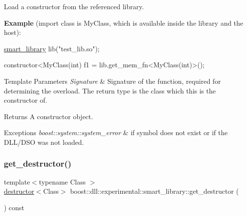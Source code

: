 Load a constructor from the referenced library.

{\bfseries Example} (import class is My\+Class, which is available inside the library and the host)\+:


\begin{DoxyCode}
\hyperlink{a01712_af1fa4c4ed871e889f92f4c11d574d91f}{smart\_library} lib(\textcolor{stringliteral}{"test\_lib.so"});

constructor<MyClass(\textcolor{keywordtype}{int})    f1 = lib.get\_mem\_fn<MyClass(\textcolor{keywordtype}{int})>();
\end{DoxyCode}



\begin{DoxyTemplParams}{Template Parameters}
{\em Signature} & Signature of the function, required for determining the overload. The return type is the class which this is the constructor of. \\
\hline
\end{DoxyTemplParams}
\begin{DoxyReturn}{Returns}
A constructor object.
\end{DoxyReturn}

\begin{DoxyExceptions}{Exceptions}
{\em boost\+::system\+::system\+\_\+error} & if symbol does not exist or if the D\+L\+L/\+D\+SO was not loaded. \\
\hline
\end{DoxyExceptions}
\mbox{\label{a01712_aeab1cc5094ad003c67c9e4b418660d3a}} 
\subsubsection{\texorpdfstring{get\+\_\+destructor()}{get\_destructor()}}
{\footnotesize\ttfamily template$<$typename Class $>$ \\
\hyperlink{a01360}{destructor}$<$Class$>$ boost\+::dll\+::experimental\+::smart\+\_\+library\+::get\+\_\+destructor (\begin{DoxyParamCaption}{ }\end{DoxyParamCaption}) const\hspace{0.3cm}{\ttfamily [inline]}}

